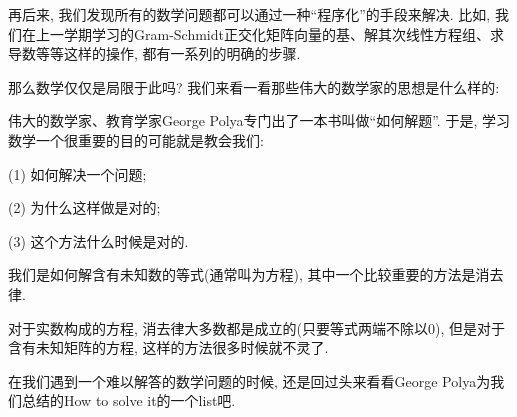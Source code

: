 再后来, 我们发现所有的数学问题都可以通过一种``程序化''的手段来解决. 比如, 我们在上一学期学习的Gram-Schmidt正交化矩阵向量的基、解其次线性方程组、求导数等等这样的操作, 都有一系列的明确的步骤. 

那么数学仅仅是局限于此吗? 我们来看一看那些伟大的数学家的思想是什么样的: 

伟大的数学家、教育学家George Polya专门出了一本书叫做``如何解题''. 于是, 学习数学一个很重要的目的可能就是教会我们:

(1) 如何解决一个问题;

(2) 为什么这样做是对的;

(3) 这个方法什么时候是对的. 

\begin{example}
	我们是如何解含有未知数的等式(通常叫为方程), 其中一个比较重要的方法是消去律. 
	
	对于实数构成的方程, 消去律大多数都是成立的(只要等式两端不除以0), 但是对于含有未知矩阵的方程, 这样的方法很多时候就不灵了. 
\end{example}

在我们遇到一个难以解答的数学问题的时候, 还是回过头来看看George Polya为我们总结的How to solve it的一个list吧. 

